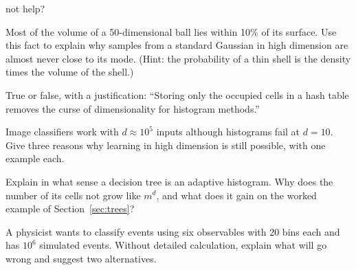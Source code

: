 \documentclass[11pt]{article}
\begin{document}
\begin{questions}
\begin{conceptual}
not help?
\item Most of the volume of a 50-dimensional ball lies within 10\% of its surface. Use this fact to explain why samples
from a standard Gaussian in high dimension are almost never close to its mode. (Hint: the probability of a thin shell
is the density times the volume of the shell.)
\item True or false, with a justification: ``Storing only the occupied cells in a hash table removes the curse of
dimensionality for histogram methods.''
\item Image classifiers work with $d \approx 10^5$ inputs although histograms fail at $d = 10$. Give three reasons why
learning in high dimension is still possible, with one example each.
\item Explain in what sense a decision tree is an adaptive histogram. Why does the number of its cells not grow like
$m^d$, and what does it gain on the worked example of Section~\ref{sec:trees}?
\item A physicist wants to classify events using six observables with 20 bins each and has $10^6$ simulated events.
Without detailed calculation, explain what will go wrong and suggest two alternatives.
\end{conceptual}


\end{questions}
\end{document}
